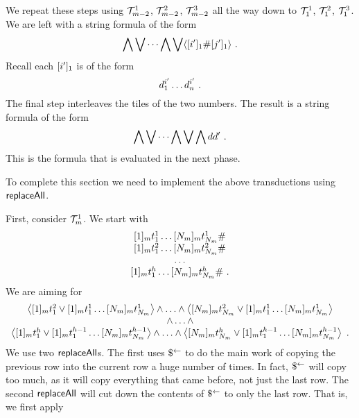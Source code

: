 We repeat these steps using $\psst^1_{\expheight-2}$,
$\psst^2_{\expheight-2}$, $\psst^3_{\expheight-2}$ all the way down to
$\psst^1_1$, $\psst^2_1$, $\psst^3_1$. We are left with a string formula of the
form
\[
    \bigwedge \bigvee \cdots \bigwedge \bigvee \lmark
        \tenc{1}{\idxi'} \spacer \tenc{1}{\idxj'}
    \rmark \ .
\]
Recall each $\tenc{1}{\idxi'}$ is of the form
\[
    \vartile^{\idxi'}_1 \ldots \vartile^{\idxi'}_\linlen \ .
\]
The final step interleaves the tiles of the two numbers. The result is a string
formula of the form
\[
    \bigwedge \bigvee \cdots \bigwedge \bigvee \bigwedge \vartile \vartile' \ .
\]
This is the formula that is evaluated in the next phase.

To complete this section we need to implement the above transductions using
$\replaceall$.

First, consider $\psst^1_\expheight$.  We start with
\[
    \begin{array}{c}
        \fullrow{1} \spacer \\
        \fullrow{2} \spacer \\
        \ldots \\
        \fullrow{\tileheight} \spacer \ .
    \end{array}
\]
We are aiming for
\[
    \begin{array}{c}
        \fbrac{
            \tenc{\expheight}{1} \tile^2_1
                \lor
                \fullrow{1}
        }
        \land
        \ldots
        \land
        \fbrac{
            \tenc{\expheight}{\nmax{\expheight}} \tile^2_{\nmax{\expheight}}
                \lor
                \fullrow{1}
        } \\
        \land \ldots \land \\
        \fbrac{
            \tenc{\expheight}{1} \tile^\tileheight_1
                \lor
                \fullrow{\tileheight-1}
        }
        \land
        \ldots
        \land
        \fbrac{
            \tenc{\expheight}{\nmax{\expheight}}
                \tile^\tileheight_{\nmax{\expheight}}
                \lor
                \fullrow{\tileheight-1}
        } \ .\\
    \end{array}
\]
We use two $\replaceall$s. The first uses $\refbefore$ to do the main work of
copying the previous row into the current row a huge number of times. In fact,
$\refbefore$ will copy too much, as it will copy everything that came before,
not just the last row. The second $\replaceall$ will cut down the contents of
$\refbefore$ to only the last row. That is, we first apply
